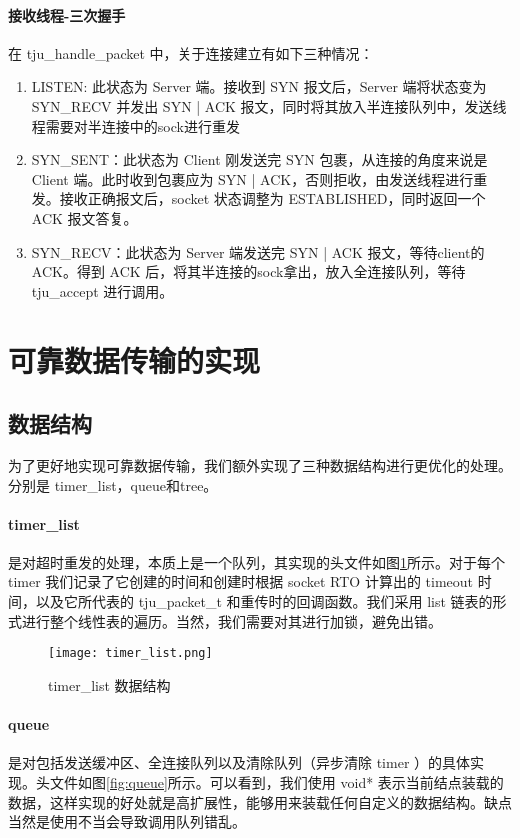 \paragraph*{接收线程-三次握手}在 tju\_handle\_packet 中，关于连接建立有如下三种情况：

\begin{enumerate}
    \item LISTEN: 此状态为 Server 端。接收到 SYN 报文后，Server 端将状态变为 SYN\_RECV 并发出 SYN | ACK 报文，同时将其放入半连接队列中，发送线程需要对半连接中的sock进行重发
    \item SYN\_SENT：此状态为 Client 刚发送完 SYN 包裹，从连接的角度来说是 Client 端。此时收到包裹应为 SYN | ACK，否则拒收，由发送线程进行重发。接收正确报文后，socket 状态调整为 ESTABLISHED，同时返回一个 ACK 报文答复。
    \item SYN\_RECV：此状态为 Server 端发送完 SYN | ACK 报文，等待client的ACK。得到 ACK 后，将其半连接的sock拿出，放入全连接队列，等待 tju\_accept 进行调用。
\end{enumerate}

\section{可靠数据传输的实现}

\subsection{数据结构}

为了更好地实现可靠数据传输，我们额外实现了三种数据结构进行更优化的处理。分别是 timer\_list，queue和tree。

\paragraph*{timer\_list} 是对超时重发的处理，本质上是一个队列，其实现的头文件如图\ref{fig:timer_list}所示。对于每个 timer 我们记录了它创建的时间和创建时根据 socket RTO 计算出的 timeout 时间，以及它所代表的 tju\_packet\_t 和重传时的回调函数。我们采用 list 链表的形式进行整个线性表的遍历。当然，我们需要对其进行加锁，避免出错。

\begin{figure}[!htbp]
    \centering
    \texttt{[image: timer\_list.png]}
    \label{fig:timer_list}\caption{timer\_list 数据结构}
  \end{figure}

\paragraph*{queue} 是对包括发送缓冲区、全连接队列以及清除队列（异步清除 timer ）的具体实现。头文件如图\ref{fig:queue}所示。可以看到，我们使用 void* 表示当前结点装载的数据，这样实现的好处就是高扩展性，能够用来装载任何自定义的数据结构。缺点当然是使用不当会导致调用队列错乱。

